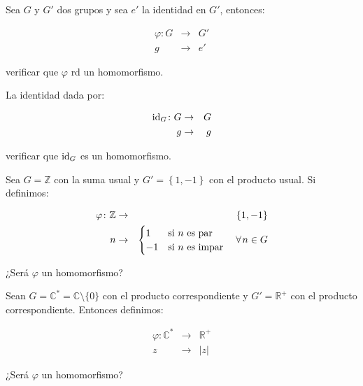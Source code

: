         \begin{ejercicio}
            Sea $G$ y $G'$ dos grupos y sea $e'$ la identidad en $G'$, entonces:

            \begin{eqnarray*}
                \varphi \colon G & \to & G' \\
                g & \to & e'
            \end{eqnarray*}

            verificar que $\varphi$ rd un homomorfismo.
        \end{ejercicio}

        \begin{ejercicio}
            La identidad dada por:

            \begin{eqnarray*}
                \operatorname{id}_G \colon G & \to & G \\
                g & \to & g
            \end{eqnarray*}

            verificar que $\operatorname{id}_G$ es un homomorfismo.
        \end{ejercicio}

        \begin{ejercicio}
            Sea $G = \mathbb{Z}$ con la suma usual y $G' = \left\{ 1, -1 \right\}$ con el producto usual. Si definimos:

            \begin{eqnarray*}
                \varphi \colon \mathbb{Z} & \to & \left\{ 1, -1 \right\} \\
                n & \to &
                \begin{cases}
                    1 & \text{si } n \text{ es par} \\
                    -1 & \text{si } n \text{ es impar}
                \end{cases} \quad \forall \mkern2mu n \in G
            \end{eqnarray*}

            ¿Será $\varphi$ un homomorfismo?
        \end{ejercicio}

        \begin{ejercicio}
            Sean $G = \mathbb{C}^* = \mathbb{C} \setminus \{0\}$ con el producto correspondiente y $G' = \mathbb{R}^+$ con el producto correspondiente. Entonces definimos:

            \begin{eqnarray*}
                \varphi \colon \mathbb{C}^* & \to & \mathbb{R}^+ \\
                z & \to & |z|
            \end{eqnarray*}

            ¿Será $\varphi$ un homomorfismo?
        \end{ejercicio}

